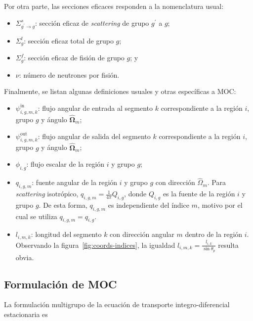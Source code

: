 \documentclass[11pt]{article}
\numberwithin{equation}{section}
\begin{document}
Por otra parte, las secciones eficaces responden a la nomenclatura usual:

\begin{itemize}
\renewcommand\labelitemi{$\cdot$}
 \item $\Sigma^s_{g^\prime \rightarrow g}$: sección eficaz de \emph{scattering} de grupo $g^\prime$ a $g$;
 \item $\Sigma^t_g$: sección eficaz total de grupo $g$;
 \item $\Sigma^f_g$: sección eficaz de fisión de grupo $g$; y
 \item $\nu$: número de neutrones por fisión.
\end{itemize}

Finalmente, se listan algunas definiciones usuales y otras específicas a MOC:

\begin{itemize}
\renewcommand\labelitemi{$\cdot$}
 \item $\psi^{\text{in}}_{i,g,m,k}$: flujo angular de entrada al segmento $k$ correspondiente a la región $i$, grupo $g$ y ángulo $\boldsymbol{\hat{\Omega}}_m$;
 \item $\psi^{\text{out}}_{i,g,m,k}$: flujo angular de salida del segmento $k$ correspondiente a la región $i$, grupo $g$ y ángulo $\boldsymbol{\hat{\Omega}}_m$;
 \item $\phi_{i,g}$: flujo escalar de la región $i$ y grupo $g$;
 \item $q_{i,g,m}$: fuente angular de la región $i$ y grupo $g$ con dirección $\hat{\Omega}_m$. Para \emph{scattering} isotrópico, $q_{i,g,m} = \frac{1}{4\pi}Q_{i,g}$, donde $Q_{i,g}$ es la fuente de la región $i$ y grupo $g$. De esta forma, $q_{i,g,m}$ es independiente del índice $m$, motivo por el cual se utiliza $q_{i,g,m} = q_{i,g}$.
 \item $l_{i,m,k}$: longitud del segmento $k$ con dirección angular $m$ dentro de la región $i$. Observando la figura~\ref{fig:coords-indices}, la igualdad $l_{i,m,k} = \frac{l_{i,k}}{\sin \theta_p}$ resulta obvia.
\end{itemize}

\subsection{Formulación de MOC}

La formulación multigrupo de la ecuación de transporte integro-diferencial estacionaria es~\cite{henry,lamarsh,duderstadt,glasstone,lewis,stammler,handbook-ingnuclear}
\end{document}
